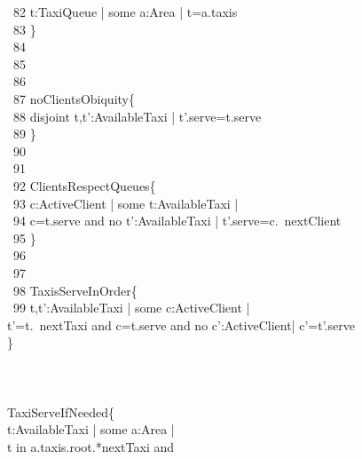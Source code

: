 \-    \ 82	\qquad \- t:TaxiQueue | {\color{blue}some} a:Area | t=a.taxis\\
\-    \ 83	\qquad \}\\
\-    \ 84	\qquad \\
\-    \ 85	\\
\-    \ 86	\\
\-    \ 87	 noClientsObiquity\{\\
\-    \ 88	\qquad \- disjoint t,t':AvailableTaxi | t'.serve=t.serve\\
\-    \ 89	\qquad \}\\
\-    \ 90	\qquad \\
\-    \ 91	\\
\-    \ 92	 ClientsRespectQueues\{\\
\-    \ 93	\qquad \- c:ActiveClient | {\color{blue}some} t:AvailableTaxi | \\
\-    \ 94	\qquad \-\qquad c=t.serve {\color{blue}and} no t':AvailableTaxi | t'.serve=c.~nextClient\\
\-    \ 95	\qquad \}\\
\-    \ 96	\qquad \\
\-    \ 97	\\
\-    \ 98	 TaxisServeInOrder\{\\
\-    \ 99	\qquad \- t,t':AvailableTaxi | {\color{blue}some} c:ActiveClient | \\
	\qquad \-\qquad t'=t.~nextTaxi {\color{blue}and} c=t.serve {\color{blue}and} no c':ActiveClient| c'=t'.serve\\
	\qquad \}\\
	\qquad \\
	\\
	\\
	 TaxiServeIfNeeded\{\\
	\qquad \- t:AvailableTaxi | {\color{blue}some} a:Area | \\
	\qquad \-\qquad t {\color{blue}in} a.taxis.root.*nextTaxi and\\
